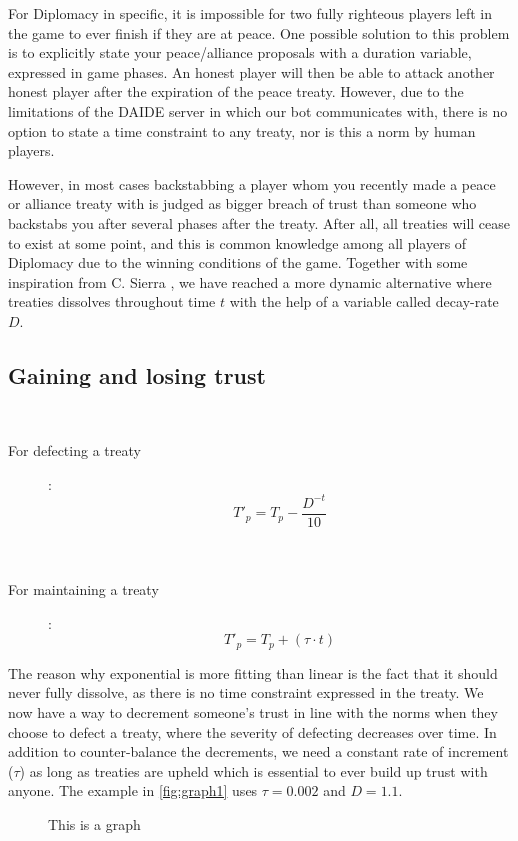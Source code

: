 \documentclass[a4paper]{article} %
\begin{document}
For Diplomacy in specific, it is impossible for two fully righteous players left in the game to ever finish if they are at peace. One possible solution to this problem is to explicitly state your peace/alliance proposals with a duration variable, expressed in game phases. An honest player will then be able to attack another honest player after the expiration of the peace treaty. However, due to the limitations of the DAIDE server in which our bot communicates with, there is no option to state a time constraint to any treaty, nor is this a norm by human players.

However, in most cases backstabbing a player whom you recently made a peace or alliance treaty with is judged as bigger breach of trust than someone who backstabs you after several phases after the treaty. After all, all treaties will cease to exist at some point, and this is common knowledge among all players of Diplomacy due to the winning conditions of the game. Together with some inspiration from C. Sierra \cite{trust}, we have reached a more dynamic alternative where treaties dissolves throughout time $t$ with the help of a variable called decay-rate $D$.

\subsection{Gaining and losing trust}
\
\begin{description}
\item[For defecting a treaty]: 
$$T'_p = T_p - \frac{D^{-t}} {10}$$ \\
\
\item[For maintaining a treaty]: 
$$T'_p = T_p + (\tau \cdot t)$$
\end{description}

The reason why exponential is more fitting than linear is the fact that it should never fully dissolve, as there is no time constraint expressed in the treaty. We now have a way to decrement someone's trust in line with the norms when they choose to defect a treaty, where the severity of defecting decreases over time. In addition to counter-balance the decrements, we need a constant rate of increment ($\tau$) as long as treaties are upheld which is essential to ever build up trust with anyone. The example in \autoref{fig:graph1} uses $\tau = 0.002$ and $D = 1.1$.

\begin{figure}[H]
\centering
{}
\caption{This is a graph}
\label{fig:graph1}
\end{figure}
\end{document}
